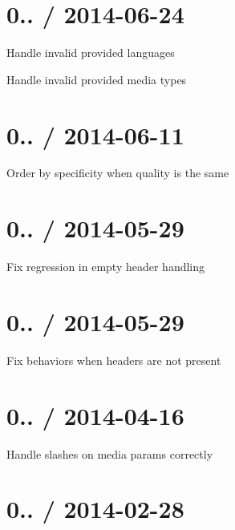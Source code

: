 \section*{0.. / 2014-\/06-\/24 }


\begin{DoxyItemize}
\item Handle invalid provided languages
\item Handle invalid provided media types
\end{DoxyItemize}

\section*{0.. / 2014-\/06-\/11 }


\begin{DoxyItemize}
\item Order by specificity when quality is the same
\end{DoxyItemize}

\section*{0.. / 2014-\/05-\/29 }


\begin{DoxyItemize}
\item Fix regression in empty header handling
\end{DoxyItemize}

\section*{0.. / 2014-\/05-\/29 }


\begin{DoxyItemize}
\item Fix behaviors when headers are not present
\end{DoxyItemize}

\section*{0.. / 2014-\/04-\/16 }


\begin{DoxyItemize}
\item Handle slashes on media params correctly
\end{DoxyItemize}

\section*{0.. / 2014-\/02-\/28 }


